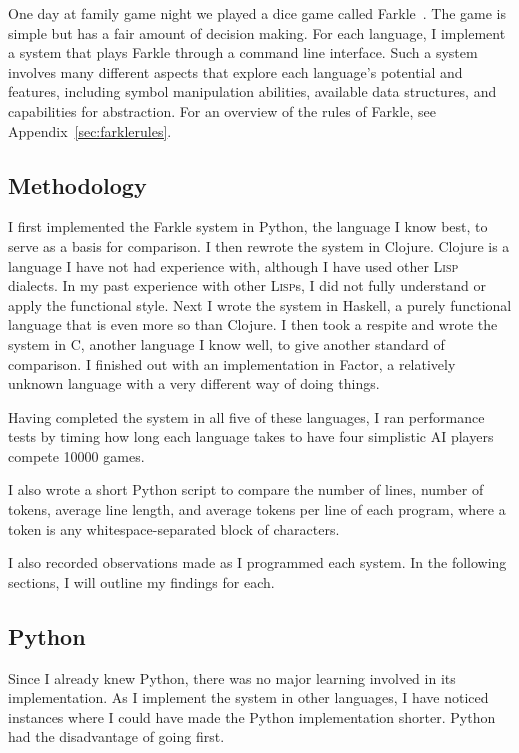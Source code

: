 \documentclass{article}
\begin{document}
One day at family game night we played a dice game called
Farkle~\cite{farklewikipedia}.  The game is simple but has a fair amount of
decision making.  For each language, I implement a system that plays Farkle
through a command line interface.  Such a system involves many different
aspects that explore each language's potential and features, including symbol
manipulation abilities, available data structures, and capabilities for
abstraction.  For an overview of the rules of Farkle, see
Appendix~\ref{sec:farklerules}.

\subsection{Methodology}

I first implemented the Farkle system in Python, the language I know
best, to serve as a basis for comparison.  I then rewrote the system in Clojure.
Clojure is a language I have not had experience with, although I have used other
\textsc{Lisp} dialects.  In my past experience with other \textsc{Lisp}s, I did not
fully understand or apply the functional style.  Next I wrote the system in
Haskell, a purely functional language that is even more so than Clojure.  I
then took a respite and wrote the system in C, another language I know well, to
give another standard of comparison.  I finished out with an implementation in
Factor, a relatively unknown language with a very different way of doing things.

Having completed the system in all five of these languages, I ran performance
tests by timing how long each language takes to have four simplistic AI players
compete 10000 games.

I also wrote a short Python script to compare the number of lines, number of
tokens, average line length, and average tokens per line of each program, where
a token is any whitespace-separated block of characters.

I also recorded observations made as I programmed each system.  In the following
sections, I will outline my findings for each.

\subsection{Python}

Since I already knew Python, there was no major learning involved in its
implementation.  As I implement the system in other languages, I have noticed
instances where I could have made the Python implementation shorter.  Python had
the disadvantage of going first.
\end{document}
